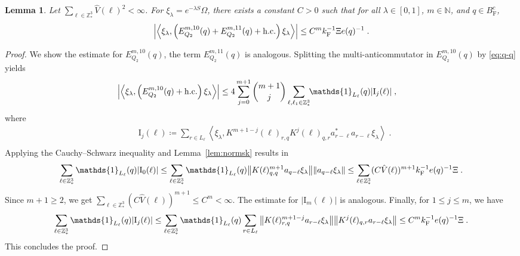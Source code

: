 \documentclass[12pt,a4paper]{article}
\numberwithin{equation}{section}
\newcommand{\NNN}{\mathbb{N}}
\newcommand{\1}{\mathbb{I}}
\newcommand{\F}{\mathrm{F}}
\newcommand{\I}{\mathrm{I}}
\newcommand{\Z}{\mathbb{Z}}
\newcommand{\eva}[1]{\left\langle #1 \right\rangle}
\theoremstyle{plain}
\newtheorem{lemma}[theorem]{Lemma}
\theoremstyle{definition}
\theoremstyle{remark}
\theoremstyle{plain}
\theoremstyle{definition}
\theoremstyle{remark}
\begin{document}
\begin{lemma} \label{lem:EQ212}
Let $ \sum_{\ell \in \Z^3_*} \hat{V}(\ell)^2 < \infty $. For $\xi_\lambda = e^{-\lambda S} \Omega$, there exists a constant $ C > 0 $ such that for all $ \lambda \in [0,1] $, $ m \in \NNN $, and $ q \in B_{\F}^c $,
\begin{equation}
	\abs{\eva{\xi_\lambda,\left(E^{m,10}_{Q_2}(q) + E^{m,11}_{Q_2}(q) + \mathrm{h.c.}\right) \xi_\lambda }}
	\leq C^m k_{\F}^{-1} \Xi e(q)^{-1} \;. \label{eq:estEQ212}
\end{equation}
\end{lemma}

\begin{proof}
We show the estimate for $ E^{m,10}_{Q_2}(q) $, the term $ E^{m,11}_{Q_2}(q) $ is analogous.
Splitting the multi-anticommutator in $ E^{m,10}_{Q_2}(q) $ by \eqref{eq:q-q} yields
\begin{equation} \label{eq:EQ2121}
\begin{aligned}
	& \abs{\eva{\xi_\lambda,\left(E^{m,10}_{Q_2}(q) + \mathrm{h.c.}\right) \xi_\lambda }}
	\le 4 \sum_{j=0}^{m+1} {{m+1}\choose j} \sum_{\ell,\ell_1  \in \Z^3_*}\!\! \mathds{1}_{L_\ell}(q) |\I_j(\ell)| \;,
\end{aligned}
\end{equation}
where
\begin{equation}
\begin{aligned}
	& \I_j(\ell)
	\coloneq \sum_{r\in L_{\ell}}
		\eva{\xi_\lambda, K^{m+1-j}(\ell)_{r,q} K^{j}(\ell)_{q,r} a^*_{r-\ell} a_{r-\ell} \xi_\lambda} \;. \\
\end{aligned}
\end{equation}
Applying the Cauchy--Schwarz inequality and Lemma~\ref{lem:normsk} results in
\begin{equation}
	\sum_{\ell \in \Z^3_*} \mathds{1}_{L_\ell}(q) |\I_0(\ell)|
	\leq \sum_{\ell \in \Z^3_*} \mathds{1}_{L_\ell}(q) \norm{ K(\ell)^{m+1}_{q,q} a_{q-\ell} \xi_\lambda}\norm{ a_{q-\ell} \xi_\lambda }
	\leq \sum_{\ell \in \Z^3_*} (C \hat{V}(\ell))^{m+1}
		k_{\F}^{-1} e(q)^{-1} \Xi \;.\label{eq:estEQ2121}
\end{equation}
Since $ m+1 \ge 2 $, we get $ \sum_{\ell \in \Z^3_*} (C \hat{V}(\ell))^{m+1} \le C^m < \infty $. The estimate for $ |\I_m(\ell)| $ is analogous. Finally, for $ 1 \le j \le m $, we have
\begin{equation}
	\sum_{\ell \in \Z^3_*} \mathds{1}_{L_\ell}(q) |\I_j(\ell)|
	\leq \sum_{\ell \in \Z^3_*} \mathds{1}_{L_\ell}(q)
		\sum\limits_{r \in L_{\ell}}
		\norm{ K(\ell)^{m+1-j}_{r,q} a_{r-\ell}\xi_\lambda}
		\norm{ K^j(\ell)_{q,r} a_{r-\ell} \xi_\lambda }
	\leq C^m k_{\F}^{-1} e(q)^{-1} \Xi \;. \label{eq:estEQ2122}
\end{equation}
This concludes the proof.
\end{proof}
\end{document}
